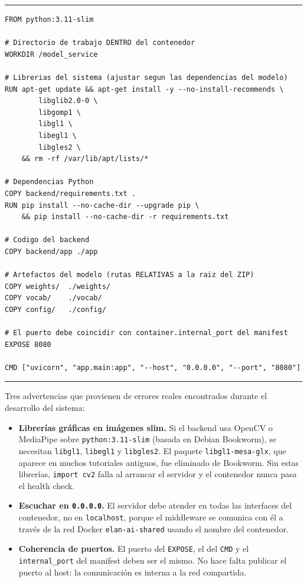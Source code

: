 \documentclass[12pt,a4paper]{article}
\begin{document}
\begin{center}
\begin{minipage}{0.92\textwidth}
\hrule
\vspace{0.06cm}
\footnotesize
\begin{Verbatim}[baselinestretch=0.8]
FROM python:3.11-slim

# Directorio de trabajo DENTRO del contenedor
WORKDIR /model_service

# Librerias del sistema (ajustar segun las dependencias del modelo)
RUN apt-get update && apt-get install -y --no-install-recommends \
        libglib2.0-0 \
        libgomp1 \
        libgl1 \
        libegl1 \
        libgles2 \
    && rm -rf /var/lib/apt/lists/*

# Dependencias Python
COPY backend/requirements.txt .
RUN pip install --no-cache-dir --upgrade pip \
    && pip install --no-cache-dir -r requirements.txt

# Codigo del backend
COPY backend/app ./app

# Artefactos del modelo (rutas RELATIVAS a la raiz del ZIP)
COPY weights/  ./weights/
COPY vocab/    ./vocab/
COPY config/   ./config/

# El puerto debe coincidir con container.internal_port del manifest
EXPOSE 8080

CMD ["uvicorn", "app.main:app", "--host", "0.0.0.0", "--port", "8080"]
\end{Verbatim}
\vspace{0.03cm}
\hrule
{}
\end{minipage}
\end{center}

Tres advertencias que provienen de errores reales encontrados durante el desarrollo del sistema:

\begin{itemize}[topsep=2pt]
    \item \textbf{Librerías gráficas en imágenes slim.} Si el backend usa OpenCV o MediaPipe sobre \texttt{python:3.11-slim} (basada en Debian Bookworm), se necesitan \texttt{libgl1}, \texttt{libegl1} y \texttt{libgles2}. El paquete \texttt{libgl1-mesa-glx}, que aparece en muchos tutoriales antiguos, fue eliminado de Bookworm. Sin estas librerías, \texttt{import cv2} falla al arrancar el servidor y el contenedor nunca pasa el health check.
    \item \textbf{Escuchar en \texttt{0.0.0.0}.} El servidor debe atender en todas las interfaces del contenedor, no en \texttt{localhost}, porque el middleware se comunica con él a través de la red Docker \texttt{elan-ai-shared} usando el nombre del contenedor.
    \item \textbf{Coherencia de puertos.} El puerto del \texttt{EXPOSE}, el del \texttt{CMD} y el \texttt{internal\_port} del manifest deben ser el mismo. No hace falta publicar el puerto al host: la comunicación es interna a la red compartida.
\end{itemize}
\end{document}
